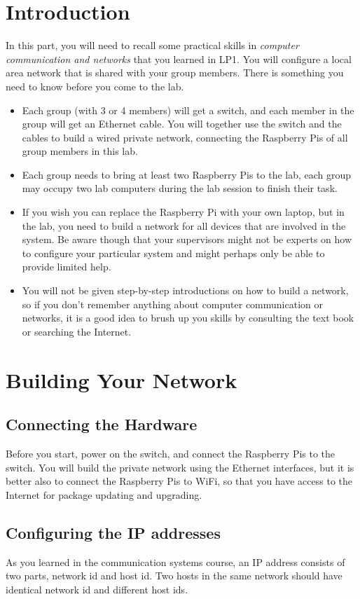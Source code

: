 \documentclass{article}
\begin{document}
\section{Introduction}
In this part, you will need to recall some practical skills in {\em computer communication and networks} that you learned in LP1. You will configure a local area network that is shared with your group members. There is something you need to know before you come to the lab.
\begin{itemize}
    \item Each group (with 3 or 4 members) will get a switch, and each member in the group will get an Ethernet cable. You will together use the switch and the cables to build a wired private network, connecting the Raspberry Pis of all group members in this lab.
    \item Each group needs to bring at least two Raspberry Pis to the lab, each group may occupy two lab computers during the lab session to finish their task.
    \item If you wish you can replace the Raspberry Pi with your own laptop, but in the lab, you need to build a network for all devices that are involved in the system. Be aware though that your supervisors might not be experts on how to configure your particular system and might perhaps only be able to provide limited help.
    \item You will not be given step-by-step introductions on how to build a network, so if you don't remember anything about computer communication or networks, it is a good idea to brush up you skills by consulting the text book or searching the Internet.
\end{itemize}

\section{Building Your Network}
\subsection{Connecting the Hardware}
Before you start, power on the switch, and connect the Raspberry Pis to the switch. You will build the private network using the Ethernet interfaces, but it is better also to connect the Raspberry Pis to WiFi, so that you have access to the Internet for package updating and upgrading.
\subsection{Configuring the IP addresses}
As you learned in the communication systems course, an IP address consists of two parts, network id and host id. Two hosts in the same network should have identical network id and different host ids.\\
\end{document}
